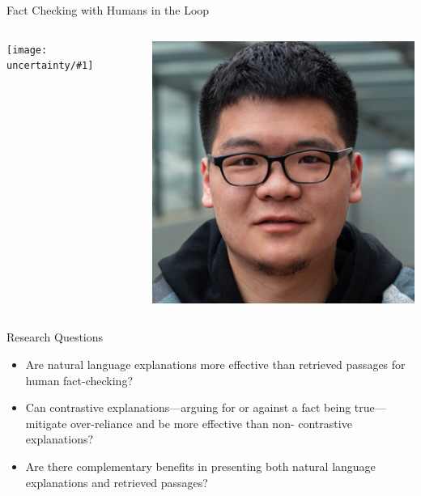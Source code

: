 \documentclass[compress]{beamer}
\newcommand{\gfxu}[2]{
	\begin{center}
		\texttt{[image: uncertainty/\#1]}
	\end{center}
}
\begin{document}
\begin{frame}{Fact Checking with Humans in the Loop}
	\begin{columns}

\gfxu{paper_convincingly}{.9}

\begin{center}
\includegraphics[width=1.0\linewidth]{general_figures/chenglei}		
	
\end{center}
	\end{columns}
\end{frame}

\begin{frame}{Research Questions}
	\begin{itemize}
		\item Are natural language explanations more effective than retrieved passages for human fact-checking?
		\item Can contrastive explanations—arguing for or against a fact being true—mitigate over-reliance and be more effective than non- contrastive explanations?
		\item  Are there complementary benefits in presenting both natural language explanations and retrieved passages?
	\end{itemize}
\end{frame}
 
\end{document}
